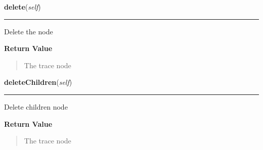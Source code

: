 \hspace{.8\funcindent}\begin{boxedminipage}{\funcwidth}

    \raggedright \textbf{delete}(\textit{self})

    \vspace{-1.5ex}

    \rule{\textwidth}{0.5\fboxrule}
\setlength{\parskip}{2ex}
    Delete the node

\setlength{\parskip}{1ex}
      \textbf{Return Value}
    \vspace{-1ex}

      \begin{quote}
      The trace node

      \end{quote}

    \end{boxedminipage}

    \label{tracetool:TraceNode:deleteChildren}

    \vspace{0.5ex}

\hspace{.8\funcindent}\begin{boxedminipage}{\funcwidth}

    \raggedright \textbf{deleteChildren}(\textit{self})

    \vspace{-1.5ex}

    \rule{\textwidth}{0.5\fboxrule}
\setlength{\parskip}{2ex}
    Delete children node

\setlength{\parskip}{1ex}
      \textbf{Return Value}
    \vspace{-1ex}

      \begin{quote}
      The trace node

      \end{quote}

    \end{boxedminipage}

    \label{tracetool:TraceNode:setBookmark}

    \vspace{0.5ex}

